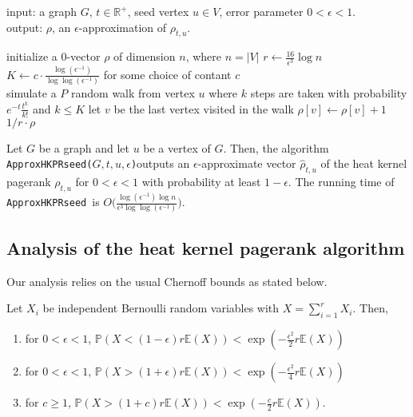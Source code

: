 \documentclass[runningheads,a4paper]{llncs}
\newcommand{\R}{\mathbb{R}}
\newcommand{\E}{\mathbb{E}}
\renewcommand{\P}{\mathbb{P}}
\newcommand{\hkprseedalg}{\texttt{ApproxHKPRseed}}
\newcommand{\hkprseedalgparams}{\texttt{ApproxHKPRseed($G,t,u,\epsilon$)}}
\newcommand{\rparam}{\frac{16}{\epsilon^3}\log n}
\newcommand{\kparam}{\frac{\log(\epsilon^{-1})}{\log\log(\epsilon^{-1})}}
\newcommand{\hkprcomplexity}{O\big(\frac{\log(\epsilon^{-1})\log n}{\epsilon^3\log\log(\epsilon^{-1})}\big)}
\begin{document}
\begin{algorithm}[H]
\caption*{\hkprseedalgparams}
\label{alg:hkprseed}
input: a graph $G$, $t\in \R^{+}$, seed vertex $u\in V$, error parameter $0 < \epsilon < 1$.\\
output: $\rho$, an $\epsilon$-approximation of $\rho_{t,u}$.\\
\begin{algorithmic}
  \State initialize a $0$-vector $\rho$ of dimension $n$, where $n=|V|$
  \State $r \gets \rparam$
  \State $K \gets c\cdot\kparam$ for some choice of contant $c$\\
    \Start
      \State simulate a $P$ random walk from vertex $u$ where $k$ steps are taken with probability $e^{-t}\frac{t^k}{k!}$ and $k \leq K$
      \State let $v$ be the last vertex visited in the walk
      \State $\rho[v] \gets \rho[v] + 1$
    \End
  \EndFor\\
  \State
  \Return $1/r \cdot \rho$  
\end{algorithmic} 
\end{algorithm}

\begin{theorem}\label{thm:hkpraccuracy}
Let $G$ be a graph and let $u$ be a vertex of $G$.  Then, the algorithm
\hkprseedalgparams outputs an $\epsilon$-approximate vector $\hat{\rho}_{t,u}$ of the
heat kernel pagerank $\rho_{t,u}$ for $0 < \epsilon < 1$ with probability at least
$1-\epsilon$.  The running time of \hkprseedalg~is $\hkprcomplexity$.
\end{theorem}

\subsection{Analysis of the heat kernel pagerank algorithm}
\label{sec:hkpranalysis}
Our analysis relies on the usual Chernoff bounds as stated below.

\begin{lemma}\label{lem:chernoff}
Let $X_i$ be independent Bernoulli random variables with $X = \sum\limits_{i = 1}^r X_i$.  Then, 
\begin{enumerate}
\item for $0 < \epsilon < 1$, $\P(X < (1-\epsilon)r\E(X)) < \exp(-\frac{\epsilon^2}{2}r\E(X))$
\item for $0 < \epsilon < 1$, $\P(X > (1+\epsilon)r\E(X)) < \exp(-\frac{\epsilon^2}{4}r\E(X))$
\item for $c \geq 1$, $\P(X > (1+c)r\E(X)) < \exp(-\frac{c}{2}r\E(X))$.
\end{enumerate}
\end{lemma}
\end{document}
